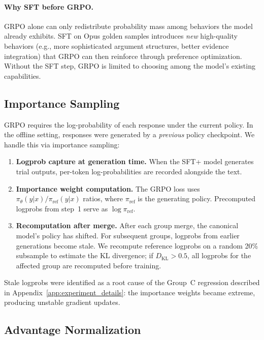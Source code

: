 \paragraph{Why SFT before GRPO.}
GRPO alone can only redistribute probability mass among behaviors the
model already exhibits. SFT on Opus golden samples introduces
\emph{new} high-quality behaviors (e.g., more sophisticated argument
structures, better evidence integration) that GRPO can then reinforce
through preference optimization. Without the SFT step, GRPO is
limited to choosing among the model's existing capabilities.

\subsection{Importance Sampling}

GRPO requires the log-probability of each response under the current
policy. In the offline setting, responses were generated by a
\emph{previous} policy checkpoint. We handle this via importance sampling:

\begin{enumerate}
\item \textbf{Logprob capture at generation time.} When the SFT+ model
    generates trial outputs, per-token log-probabilities are recorded
    alongside the text.

\item \textbf{Importance weight computation.} The GRPO loss uses
    $\pi_\theta(y|x) / \pi_{\text{ref}}(y|x)$ ratios, where
    $\pi_{\text{ref}}$ is the generating policy. Precomputed logprobs
    from step~1 serve as $\log \pi_{\text{ref}}$.

\item \textbf{Recomputation after merge.} After each group merge, the
    canonical model's policy has shifted. For subsequent groups, logprobs
    from earlier generations become stale. We recompute reference logprobs
    on a random 20\% subsample to estimate the KL divergence; if
    $D_\text{KL} > 0.5$, all logprobs for the affected group are
    recomputed before training.
\end{enumerate}

Stale logprobs were identified as a root cause of the Group~C regression
described in Appendix~\ref{app:experiment_details}: the importance
weights became extreme, producing unstable gradient updates.

\subsection{Advantage Normalization}

